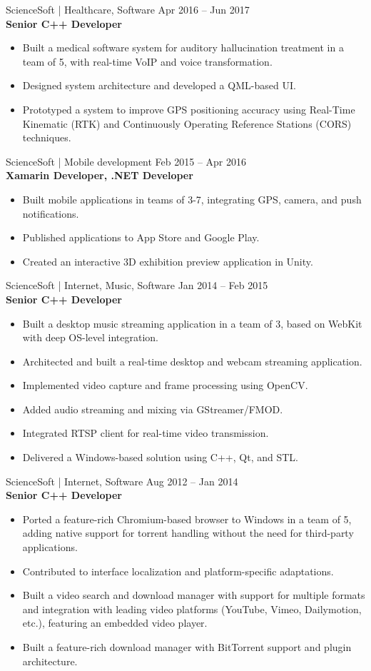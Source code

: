 \documentclass[10pt, a4paper]{article}
\newcommand{\roleentry}[3]{%
    \vspace{8pt}%
    {\normalsize #1 \hfill {\small\color{graytext}#3}}\\[1pt]%
    {\textbf{#2}}%
    \vspace{1pt}%
}
\begin{document}
\roleentry{ScienceSoft | Healthcare, Software}{Senior C++ Developer}{Apr 2016 -- Jun 2017}
\begin{itemize}
    \item Built a medical software system for auditory hallucination treatment in a team of 5, with real-time VoIP and voice transformation.
    \item Designed system architecture and developed a QML-based UI.
    \item Prototyped a system to improve GPS positioning accuracy using Real-Time Kinematic (RTK) and Continuously Operating Reference Stations (CORS) techniques.
\end{itemize}

\roleentry{ScienceSoft | Mobile development}{Xamarin Developer, .NET Developer}{Feb 2015 -- Apr 2016}
\begin{itemize}
    \item Built mobile applications in teams of 3-7, integrating GPS, camera, and push notifications.
    \item Published applications to App Store and Google Play.
    \item Created an interactive 3D exhibition preview application in Unity.
\end{itemize}

\roleentry{ScienceSoft | Internet, Music, Software}{Senior C++ Developer}{Jan 2014 -- Feb 2015}
\begin{itemize}
    \item Built a desktop music streaming application in a team of 3, based on WebKit with deep OS-level integration.
    \item Architected and built a real-time desktop and webcam streaming application.
    \item Implemented video capture and frame processing using OpenCV.
    \item Added audio streaming and mixing via GStreamer/FMOD.
    \item Integrated RTSP client for real-time video transmission.
    \item Delivered a Windows-based solution using C++, Qt, and STL.
\end{itemize}

\roleentry{ScienceSoft | Internet, Software}{Senior C++ Developer}{Aug 2012 -- Jan 2014}
\begin{itemize}
    \item Ported a feature-rich Chromium-based browser to Windows in a team of 5, adding native support for torrent handling without the need for third-party applications.
    \item Contributed to interface localization and platform-specific adaptations.
    \item Built a video search and download manager with support for multiple formats and integration with leading video platforms (YouTube, Vimeo, Dailymotion, etc.), featuring an embedded video player.
    \item Built a feature-rich download manager with BitTorrent support and plugin architecture.
\end{itemize}
\end{document}
